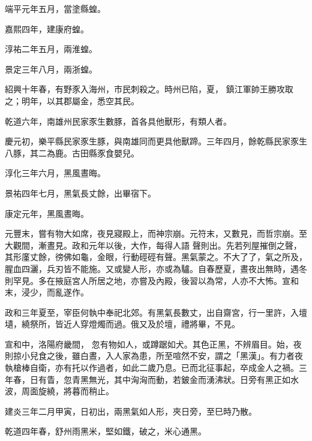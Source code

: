 \begin{pinyinscope}
 端平元年五月，當塗縣蝗。



 嘉熙四年，建康府蝗。



 淳祐二年五月，兩淮蝗。



 景定三年八月，兩浙蝗。



 紹興十年春，有野豕入海州，市民刺殺之。時州已陷，夏，
 鎮江軍帥王勝攻取之；明年，以其郡屬金，悉空其民。



 乾道六年，南雄州民家豕生數豚，首各具他獸形，有類人者。



 慶元初，樂平縣民家豕生豚，與南雄同而更具他獸蹄。三年四月，餘乾縣民家豕生八豚，其二為鹿。古田縣豕食嬰兒。



 淳化三年六月，黑風晝晦。



 景祐四年七月，黑氣長丈餘，出畢宿下。



 康定元年，黑風晝晦。



 元豐末，嘗有物大如席，夜見寢殿上，而神宗崩。元符末，又數見，而哲宗崩。至大觀間，漸晝見。政和元年以後，大作，每得人語
 聲則出。先若列屋摧倒之聲，其形廑丈餘，徬佛如龜，金眼，行動硜硜有聲。黑氣蒙之。不大了了，氣之所及，腥血四灑，兵刃皆不能施。又或變人形，亦或為驢。自春歷夏，晝夜出無時，遇冬則罕見。多在掖庭宮人所居之地，亦嘗及內殿，後習以為常，人亦不大怖。宣和末，浸少，而亂遂作。



 政和三年夏至，宰臣何執中奉祀北郊。有黑氣長數丈，出自齋宮，行一里許，入壇壝，繞祭所，皆近人穿燈燭而過。俄又及於壇，禮將畢，不見。



 宣和中，洛陽府畿間，
 忽有物如人，或蹲踞如犬。其色正黑，不辨眉目。始，夜則掠小兒食之後，雖白晝，入人家為患，所至喧然不安，謂之「黑漢」。有力者夜執槍棒自衛，亦有托以作過者，如此二歲乃息。已而北征事起，卒成金人之禍。三年春，日有眚，忽青黑無光，其中洶洶而動，若鈹金而湧沸狀。日旁有黑正如水波，周面旋繞，將暮而稍止。



 建炎三年二月甲寅，日初出，兩黑氣如人形，夾日旁，至巳時乃散。



 乾道四年春，舒州雨黑米，堅如鐵，破之，米心通黑。




\end{pinyinscope}
